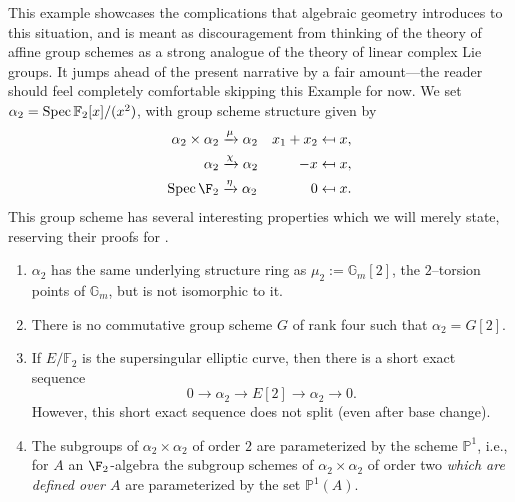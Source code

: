 \begin{example}\label{Alpha2Example}
This example showcases the complications that algebraic geometry introduces to this situation, and is meant as discouragement from thinking of the theory of affine group schemes as a strong analogue of the theory of linear complex Lie groups.  It jumps ahead of the present narrative by a fair amount---the reader should feel completely comfortable skipping this Example for now.  We set \(\alpha_2 = \operatorname{Spec} \mathbb{F}_2[x]/(x^2)\), with group scheme structure given by
\begin{align*}
\alpha_2 \times \alpha_2 &\xrightarrow{\mu} \alpha_2 & x_1 + x_2 & \mapsfrom x, \\
\alpha_2 & \xrightarrow{\chi} \alpha_2 & -x & \mapsfrom x, \\
\Spec \F_2 & \xrightarrow{\eta} \alpha_2 & 0 & \mapsfrom x.
\end{align*}
This group scheme has several interesting properties which we will merely state, reserving their proofs for .
\begin{enumerate}
\item \(\alpha_2\) has the same underlying structure ring as \(\mu_2 := \mathbb{G}_m[2]\), the \(2\)--torsion points of \(\mathbb G_m\), but is not isomorphic to it.
\item There is no commutative group scheme \(G\) of rank four such that \(\alpha_2 = G[2]\).
\item If \(E/\mathbb{F}_2\) is the supersingular elliptic curve, then there is a short exact sequence \[0 \rightarrow \alpha_2 \rightarrow E[2] \rightarrow \alpha_2 \rightarrow 0.\]  However, this short exact sequence does not split (even after base change).
\item The subgroups of \(\alpha_2 \times \alpha_2\) of order \(2\) are parameterized by the scheme \(\mathbb{P}^1\), i.e., for \(A\) an \(\F_2\)-algebra the subgroup schemes of \(\alpha_2 \times \alpha_2\) of order two \emph{which are defined over \(A\)} are parameterized by the set \(\mathbb{P}^1(A)\).
\end{enumerate}
\end{example}

